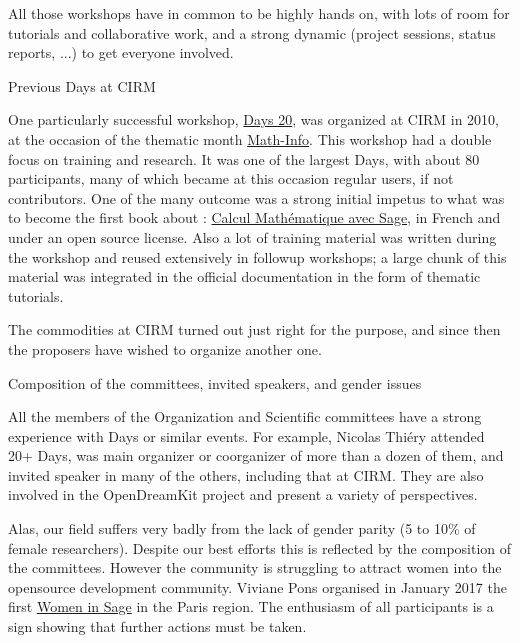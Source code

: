 \documentclass[12pt]{amsart}
\makeatletter
\def\subsection{\@startsection{subsection}{2}%
  \z@{.3\linespacing\@plus.5\linespacing}{.1\linespacing}%
  {\normalfont\bfseries}}
\makeatother
\begin{document}
All those workshops have in common to be highly hands on, with lots of
room for tutorials and collaborative work, and a strong dynamic
(project sessions, status reports, ...) to get everyone involved.

\subsection{Previous \Sage Days at CIRM}

One particularly successful workshop,
\href{https://www.lirmm.fr/arith/wiki/MathInfo2010/SageDays}{\Sage
  Days 20}, was organized at CIRM in 2010, at the occasion of the
thematic month
\href{https://www.lirmm.fr/arith/wiki/MathInfo2010/}{Math-Info}. This
workshop had a double focus on training and research. It was one of
the largest \Sage Days, with about 80 participants, many of which
became at this occasion regular \Sage users, if not contributors. One
of the many outcome was a strong initial impetus to what was to become
the first book about \Sage: \href{http://sagebook.gforge.inria.fr/}{Calcul Mathématique avec
Sage}, in French and under an open
source license. Also a lot of training material was written during the
workshop and reused extensively in followup workshops; a large chunk
of this material was integrated in the \Sage official documentation in
the form of thematic tutorials.

The commodities at CIRM turned out just right for the purpose, and
since then the proposers have wished to organize another one.

\subsection{Composition of the committees, invited speakers, and gender issues}

All the members of the Organization and Scientific committees have a
strong experience with \Sage Days or similar events. For example,
Nicolas Thiéry attended 20+ \Sage Days, was main organizer or
coorganizer of more than a dozen of them, and invited speaker in many
of the others, including that at CIRM. They are also involved in the
OpenDreamKit project and present a variety of perspectives.

Alas, our field suffers very badly from the lack of gender parity (5
to 10\% of female researchers). Despite our best efforts this is reflected by the
composition of the committees. However the community is struggling
to attract women into the opensource development community. Viviane Pons
organised in January 2017 the first \href{https://wiki.sagemath.org/days82}{Women in Sage}
in the Paris region. The enthusiasm of all participants is a sign showing
that further actions must be taken.
\end{document}
